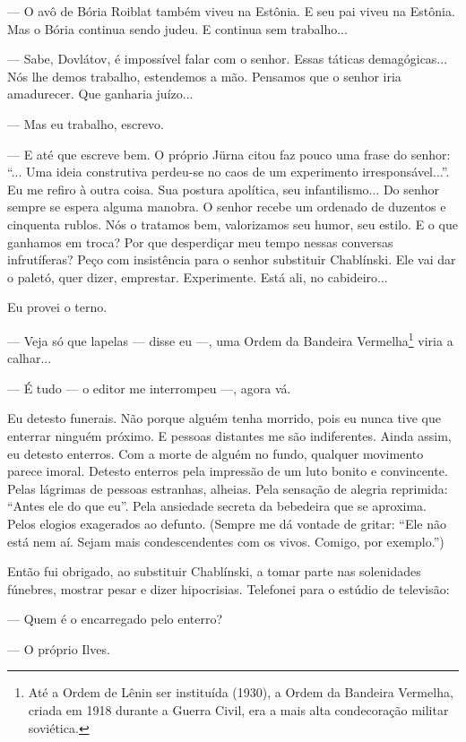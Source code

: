--- O avô de Bória Roiblat também viveu na Estônia. E seu pai viveu na
Estônia. Mas o Bória continua sendo judeu. E continua sem trabalho...

--- Sabe, Dovlátov, é impossível falar com o senhor. Essas táticas
demagógicas... Nós lhe demos trabalho, estendemos a mão. Pensamos que o
senhor iria amadurecer. Que ganharia juízo...

--- Mas eu trabalho, escrevo.

--- E até que escreve bem. O próprio Jürna citou faz pouco uma frase do
senhor: ``... Uma ideia construtiva perdeu-se no caos de um experimento
irresponsável...''. Eu me refiro à outra coisa. Sua postura apolítica,
seu infantilismo... Do senhor sempre se espera alguma manobra. O senhor
recebe um ordenado de duzentos e cinquenta rublos. Nós o tratamos bem,
valorizamos seu humor, seu estilo. E o que ganhamos em troca? Por que
desperdiçar meu tempo nessas conversas infrutíferas? Peço com
insistência para o senhor substituir Chablínski. Ele vai dar o paletó,
quer dizer, emprestar. Experimente. Está ali, no cabideiro...

Eu provei o terno.

--- Veja só que lapelas --- disse eu ---, uma Ordem da Bandeira
Vermelha\footnote{Até a Ordem de Lênin ser instituída (1930), a Ordem da
  Bandeira Vermelha, criada em 1918 durante a Guerra Civil, era a mais
  alta condecoração militar soviética.} viria a calhar...

--- É tudo --- o editor me interrompeu ---, agora vá.

Eu detesto funerais. Não porque alguém tenha morrido, pois eu nunca tive
que enterrar ninguém próximo. E pessoas distantes me são indiferentes.
Ainda assim, eu detesto enterros. Com a morte de alguém no fundo,
qualquer movimento parece imoral. Detesto enterros pela impressão de um
luto bonito e convincente. Pelas lágrimas de pessoas estranhas, alheias.
Pela sensação de alegria reprimida: ``Antes ele do que eu''. Pela
ansiedade secreta da bebedeira que se aproxima. Pelos elogios exagerados
ao defunto. (Sempre me dá vontade de gritar: ``Ele não está nem aí.
Sejam mais condescendentes com os vivos. Comigo, por exemplo.'')

Então fui obrigado, ao substituir Chablínski, a tomar parte nas
solenidades fúnebres, mostrar pesar e dizer hipocrisias. Telefonei para
o estúdio de televisão:

--- Quem é o encarregado pelo enterro?

--- O próprio Ilves.

